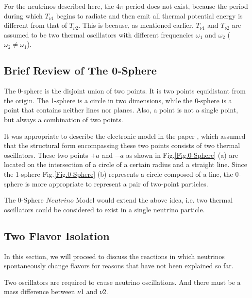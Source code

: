 \documentclass[%
 reprint,
 amsmath,amssymb,
 aps,
]{revtex4-1}
\numberwithin{equation}{section}%
\begin{document}
For the neutrinos described here, the 4$\pi$ period does not exist, because the period during which $T_{\nu \mathrm{1}}$ begins to radiate and then emit all thermal potential energy is different from that of $T_{\nu \mathrm{2}}$. This is because, as mentioned earlier, $T_{\nu \mathrm{1}}$ and $T_{\nu \mathrm{2}}$ are assumed to be two thermal oscillators with different frequencies $\omega_{\mathrm{1}}$ and $\omega_{\mathrm{2}}$ ($\omega_{\mathrm{2}} \neq \omega_{\mathrm{1}}$).


\subsection{Brief Review of The 0-Sphere}

The 0-sphere is the disjoint union of two points. It is two points equidistant from the origin. The 1-sphere is a circle in two dimensions, while the 0-sphere is a point that contains neither lines nor planes. Also, a point is not a single point, but always a combination of two points.

It was appropriate to describe the electronic model in the paper \cite{Hanamura1}, which assumed that the structural form encompassing these two points consists of two thermal oscillators. These two points $+a$ and $-a$ as shown in Fig.\ref{Fig.0-Sphere} (a) are located on the intersection of a circle of a certain radius and a straight line. Since the 1-sphere Fig.\ref{Fig.0-Sphere} (b) represents a circle composed of a line, the 0-sphere is more appropriate to represent a pair of two-point particles.

The 0-Sphere $Neutrino$ Model would extend the above idea, i.e. two thermal oscillators could be considered to exist in a single neutrino particle.



\subsection{Two Flavor Isolation}

In this section, we will proceed to discuss the reactions in which neutrinos spontaneously change flavors for reasons that have not been explained so far.

Two oscillators are required to cause neutrino oscillations. And there must be a mass difference between $\nu$1 and $\nu$2. 

\end{document}
